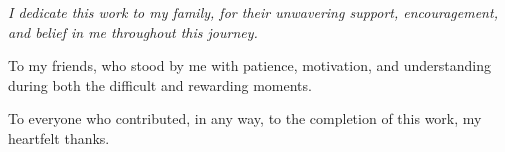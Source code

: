 \begin{dedicatoria}
	\vspace*{\fill}
	\centering
	\noindent
	{\itshape%
		I dedicate this work to my family, for their unwavering support, encouragement, and belief in me throughout this journey.\par

		To my friends, who stood by me with patience, motivation, and understanding during both the difficult and rewarding moments.\par

		To everyone who contributed, in any way, to the completion of this work, my heartfelt thanks.\par
	}
	\vspace*{\fill}
\end{dedicatoria}